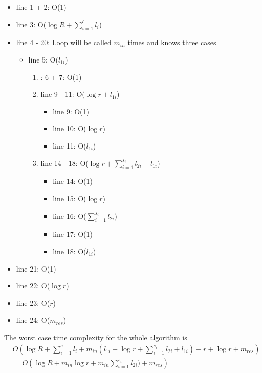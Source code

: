 \documentclass[a4paper]{article}
\begin{document}
\begin{itemize}
  \item[] line 1 + 2: O(1)
  \item[] line 3: O($\log R + \sum_{i=1}^{c}{l_i}$)
  \item[] line 4 - 20: Loop will be called $m_{in}$ times and knows three cases
  \begin{itemize}
    \item[] line 5: O($l_{1i}$)
    \begin{enumerate}
      \item: 6 + 7: O(1)
      \item line 9 - 11: O($\log r + l_{1i}$)
      \begin{itemize}
        \item[] line 9: O(1)
        \item[] line 10: O($\log r$)
        \item[] line 11: O($l_{1i}$)
      \end{itemize}
      \item line 14 - 18: O($\log r + \sum_{i=1}^{s_i}{l_{2i}} + l_{1i}$)
      \begin{itemize}
        \item[] line 14: O(1)
        \item[] line 15: O($\log r$)
        \item[] line 16: O($\sum_{i=1}^{s_i}{l_{2i}}$)
        \item[] line 17: O(1)
        \item[] line 18: O($l_{1i}$)
      \end{itemize}
    \end{enumerate}
  \end{itemize}
  \item[] line 21: O(1)
  \item[] line 22: O($\log r$)
  \item[] line 23: O($r$)
  \item[] line 24: O($m_{res}$)
\end{itemize}
The worst case time complexity for the whole algorithm is
\begin{align*}
&O(\log R + \sum_{i=1}^{c}{l_i} + m_{in}(l_{1i} + \log r + \sum_{i=1}^{s_i}{l_{2i}} + l_{1i}) + r +
\log r + m_{res})\\
&= O(\log R + m_{in}\log r + m_{in}\sum_{i=1}^{s_i}{l_{2i})} + m_{res})
\end{align*}
\end{document}
